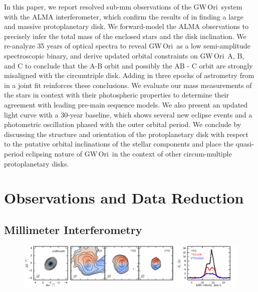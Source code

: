 \documentclass[twocolumn]{aastex61}
\newcommand{\obj}{GW\,Ori}
\begin{document}
In this paper, we report resolved sub-mm observations of the \obj\ system with the ALMA interferometer, which confirm the results of \citet{fang17} in finding a large and massive protoplanetary disk. We forward-model the ALMA observations to precisely infer the total mass of the enclosed stars and the disk inclination. We re-analyze 35 years of optical spectra to reveal \obj\ as a low semi-amplitude spectroscopic binary, and derive updated orbital constraints on \obj\ A, B, and C to conclude that the A-B orbit and possibly the AB - C orbit are strongly misaligned with the circumtriple disk. Adding in three epochs of astrometry from \citet{berger11} in a joint fit reinforces these conclusions. We evaluate our mass measurements of the stars in context with their photospheric properties to determine their agreement with leading pre-main sequence models. We also present an updated light curve with a 30-year baseline, which shows several new eclipse events and a photometric oscillation phased with the outer orbital period. We conclude by discussing the structure and orientation of the protoplanetary disk with respect to the putative orbital inclinations of the stellar components and place the quasi-period eclipsing nature of \obj\ in the context of other circum-multiple protoplanetary disks.

\section{Observations and Data Reduction \label{sec:obs}}


\subsection{Millimeter Interferometry}

\begin{figure}[ht!]
\begin{center}
  \includegraphics[width=\linewidth]{moments.pdf}
  \end{center}
\end{figure}
\end{document}
